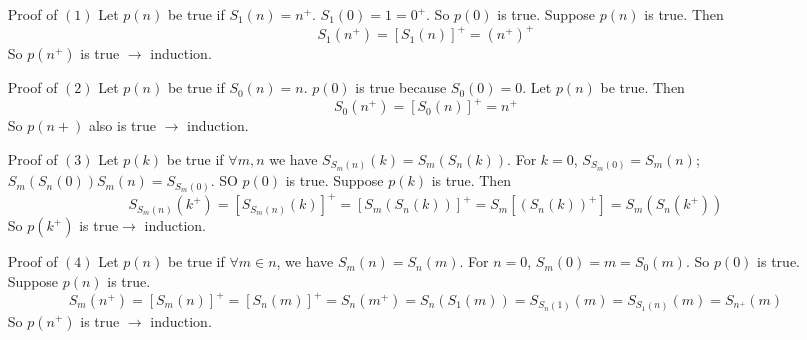 \documentclass[12pt]{amsart}
\theoremstyle{plain}
\theoremstyle{remark}
\theoremstyle{definition}
\begin{document}
\begin{enumerate}
	\item [Proof of $(1)$]
	Let $p(n)$ be true if $S_1(n) = n^+$. $S_1(0) = 1 = 0^+$. So $p(0)$ is true.
	\newline
	Suppose $p(n)$ is true. Then
	\begin{equation*}
	S_1(n^+) = \left[ S_1(n) \right]^+ = (n^+)^+
	\end{equation*}
	So $p(n^+)$ is true $\rightarrow$ induction.

	\item [Proof of $(2)$]
	Let $p(n)$ be true if $S_0(n) = n$. $p(0)$ is true because $S_0(0) = 0$.
	\newline
	Let $p(n)$ be true. Then 
	\begin{equation*}
	S_0(n^+) = \left[ S_0(n) \right]^+ = n^+
	\end{equation*}
	So $p(n+)$ also is true $\rightarrow $ induction.

	\item[Proof of $(3)$]
	Let $p(k)$ be true if $\forall m, n$ we have $S_{S_m(n)}(k) = S_m\left( S_n(k) \right)$.
	For $k=0$, $S_{S_m(0)} = S_m(n)$; $S_m(S_{n}(0)) S_m(n) = S_{S_m(0)}$. SO $p(0)$ is true.
	\newline
	Suppose $p(k)$ is true. Then 
	\begin{equation*}
		S_{S_m(n)}(k^+) = \left[ S_{S_m(n)}(k) \right]^+ = \left[ S_m(S_n(k)) \right]^+ = S_m\left[ \left( S_n(k) \right)^+ \right] = S_m\left( S_n(k^+) \right)
	\end{equation*}
	So $p(k^+)$ is true$\rightarrow$ induction.

	\item[Proof of $(4)$] 
	Let $p(n)$ be true if $\forall m \in n$, we have $S_m(n) = S_n(m)$.
	For $n = 0$, $S_m(0) = m = S_0(m)$. So $p(0)$ is true.
	\newline
	Suppose $p(n)$ is true.
	\begin{equation*}
	S_m(n^+) = \left[ S_m(n) \right]^+ = \left[ S_n(m) \right]^+ = S_n(m^+) = S_n(S_1(m)) = S_{S_n(1)}(m) = S_{S_1(n)}(m) = S_{n^+}(m)
	\end{equation*}
	So $p(n^+)$ is true $\rightarrow$ induction.
\end{enumerate}
\end{document}
